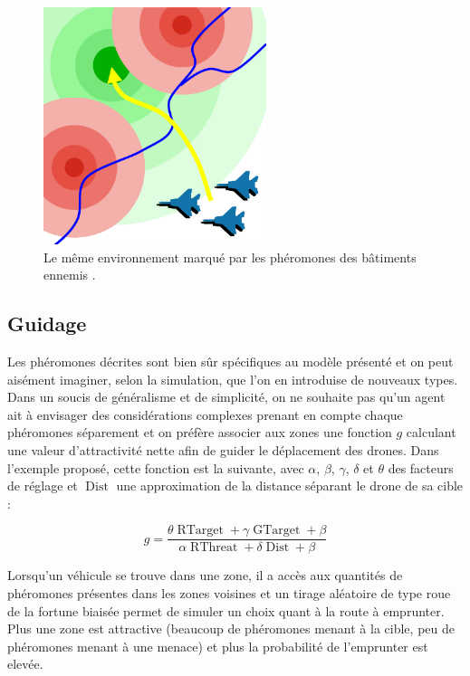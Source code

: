 \documentclass[12pt]{article}
\begin{document}
\begin{figure}[H]
  \centering

  \includegraphics[width=6.5cm]{terrain_field.png}

  \caption{Le même environnement marqué par les phéromones des
    bâtiments ennemis \cite{parunak}.}
  \label{field}
\end{figure}

\subsection{Guidage}

Les phéromones décrites sont bien sûr spécifiques au modèle présenté
et on peut aisément imaginer, selon la simulation, que l'on en
introduise de nouveaux types. Dans un soucis de généralisme et de
simplicité, on ne souhaite pas qu'un agent ait à envisager des
considérations complexes prenant en compte chaque phéromones
séparement et on préfère associer aux zones une fonction $g$ calculant
une valeur d'attractivité nette afin de guider le déplacement des
drones. Dans l'exemple proposé, cette fonction est la suivante, avec
$\alpha$, $\beta$, $\gamma$, $\delta$ et $\theta$ des facteurs de
réglage et $\operatorname{Dist}$ une approximation de la distance
séparant le drone de sa cible :

\begin{equation}
  g = \frac{ \theta \operatorname{RTarget} + \gamma
  \operatorname{GTarget} + \beta}{\alpha \operatorname{RThreat} + \delta
  \operatorname{Dist} + \beta}
  \label{g}
\end{equation}

Lorsqu'un véhicule se trouve dans une zone, il a accès aux quantités
de phéromones présentes dans les zones voisines et un tirage aléatoire
de type roue de la fortune biaisée permet de simuler un choix quant à
la route à emprunter. Plus une zone est attractive (beaucoup de
phéromones menant à la cible, peu de phéromones menant à une menace)
et plus la probabilité de l'emprunter est elevée.
\end{document}
